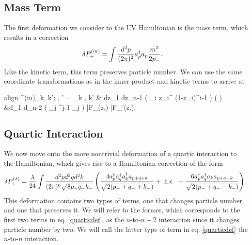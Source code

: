 \begin{subappendices}
\subsection{Mass Term} The first deformation we consider to the UV Hamiltonian is the mass term, which results in a correction \begin{equation}
	\begin{aligned}
		\delta P_+^{(m)} &= \int \frac{d^2 p}{(2\pi)^2} a^\dagger_p a_p \frac{m^2}{2p_-}.
	\end{aligned}
\end{equation} Like the kinetic term, this term preserves particle number. We can use the same coordinate transformations as in the inner product and kinetic terms to arrive at \begin{empheq}[box=\fbox]{align}
		\Mcal^{(m)}_{k, k'; \Ocal, \Ocal'} = \delta_{k , k'} & \int dz_1 \dotsb dz_{n-1} \left( \prod_i z_i^{} (1-z_i)^{i-1}  \right) \left(  \right) \nonumber \\
		&\times \int d\theta_1 \dotsb d\theta_{n-2} \left( \prod_j \sin^{j-1} \theta_j \right) \bar{F}_{\Ocal}(z,\theta) \bar{F}_{\Ocal'}(z,\theta). \end{empheq}

\subsection{Quartic Interaction} We now move onto the more nontrivial deformation of a quartic interaction to the Hamiltonian, which gives rise to a Hamiltonian correction of the form \begin{equation}
	\begin{aligned}
		\delta P_+^{(\lambda)} = \frac{\lambda}{24} \int \frac{d^2p d^2 q d^2 k}{(2\pi)^6 \sqrt{8 p_- q_- k_-}} \left( \frac{4 a^\dagger_p a^\dagger_q a^\dagger_k a_{p+q+k}}{\sqrt{2(p_- + q_- + k_-)}} + \textrm{ h.c. } + \frac{6 a^\dagger_p a^\dagger_q a_k a_{p+q-k}}{\sqrt{2(p_- + q_- - k_-)}} \right). \label{quarticdef}
	\end{aligned}
\end{equation} This deformation contains two types of terms, one that changes particle number and one that preserves it. We will refer to the former, which corresponds to the first two terms in eq. \eqref{quarticdef}, as the $n$-to-$n+2$ interaction since it changes particle number by two. We will call the latter type of term in eq. \eqref{quarticdef} the $n$-to-$n$ interaction.


\end{subappendices}
